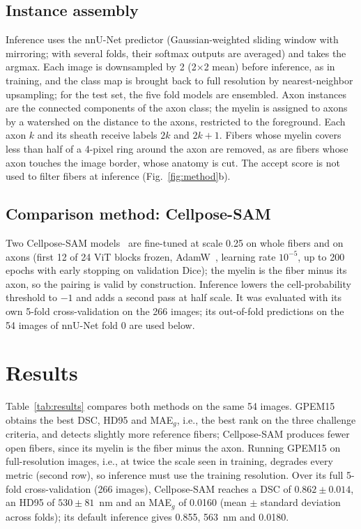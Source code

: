 \documentclass[journal]{IEEEtran}
\begin{document}
\subsection{Instance assembly}
Inference uses the nnU-Net predictor (Gaussian-weighted sliding window with
mirroring; with several folds, their softmax outputs are averaged) and takes
the argmax. Each image is downsampled by 2 (2$\times$2 mean) before inference,
as in training, and the class map is brought back to full resolution by
nearest-neighbor upsampling; for the test set, the five fold models are
ensembled. Axon instances are the connected components of the axon class; the myelin is
assigned to axons by a watershed on the distance to the axons, restricted to
the foreground. Each axon $k$ and its sheath receive labels $2k$ and $2k+1$.
Fibers whose myelin covers less than half of a 4-pixel ring around the axon are
removed, as are fibers whose axon touches the image border, whose anatomy is
cut. The accept score is not used to filter fibers at inference
(Fig.~\ref{fig:method}b).

\subsection{Comparison method: Cellpose-SAM}
Two Cellpose-SAM models~\cite{pachitariu2025} are fine-tuned at scale 0.25 on
whole fibers and on axons (first 12 of 24 ViT blocks frozen, AdamW~\cite{loshchilov2019},
learning rate $10^{-5}$, up to 200 epochs with early stopping on validation
Dice); the myelin is the fiber minus its axon, so the pairing is valid by
construction. Inference lowers the cell-probability threshold to $-1$ and adds
a second pass at half scale. It was evaluated with its own 5-fold
cross-validation on the 266 images; its out-of-fold predictions on the 54
images of nnU-Net fold 0 are used below.

\section{Results}


Table~\ref{tab:results} compares both methods on the same 54 images. GPEM15
obtains the best DSC, HD95 and MAE$_g$, i.e., the best rank on the three
challenge criteria, and detects slightly more reference fibers; Cellpose-SAM
produces fewer open fibers, since its myelin is the fiber minus the axon.
Running GPEM15 on full-resolution images, i.e., at twice the scale seen in
training, degrades every metric (second row), so inference must use the
training resolution. Over its full 5-fold cross-validation
(266 images), Cellpose-SAM reaches a DSC of $0.862\pm0.014$, an HD95 of
$530\pm81$~nm and an MAE$_g$ of 0.0160 (mean $\pm$ standard deviation across
folds); its default inference gives 0.855, 563~nm and 0.0180.
\end{document}
